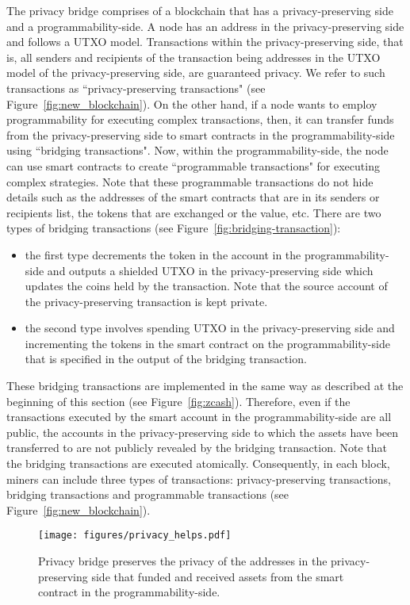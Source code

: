 \documentclass{article}
\begin{document}
The privacy bridge comprises of a blockchain that has a privacy-preserving side and a programmability-side. A node has an address in the privacy-preserving side and follows a UTXO model. Transactions within the privacy-preserving side, that is, all senders and recipients of the transaction being addresses in the UTXO model of the privacy-preserving side, are guaranteed  privacy.   We refer to such transactions as ``privacy-preserving transactions" (see Figure~\ref{fig:new_blockchain}). On the other hand, if a node wants to employ programmability for executing complex transactions, then, it can transfer funds from the privacy-preserving side to smart contracts in the programmability-side using ``bridging transactions". Now, within the programmability-side, the node can use smart contracts  to create ``programmable transactions" for executing complex strategies. Note that these programmable transactions do not hide  details such as the addresses of the smart contracts that are in its senders or recipients list, the tokens that are exchanged or the value, etc.  There are two types of bridging transactions (see  Figure~\ref{fig:bridging-transaction}): 
\begin{itemize}
    \item the first type decrements the token in the account in the programmability-side and outputs a shielded UTXO in the privacy-preserving side which updates the coins held by the transaction. Note that the source account of the privacy-preserving transaction is kept private. 
    \item the second type involves spending UTXO in the privacy-preserving side and incrementing the tokens in the smart contract on the programmability-side that is specified in the output of the bridging transaction.
\end{itemize}
These bridging transactions are implemented in the same way as described at the beginning of this section (see Figure~\ref{fig:zcash}). Therefore, even if the transactions executed by the smart account in the programmability-side are all public, the accounts in the privacy-preserving side to which the assets have been transferred to are not publicly revealed by the bridging transaction. Note that the bridging transactions are executed atomically. Consequently,  in each block, miners can include three types of transactions: privacy-preserving transactions, bridging transactions and programmable transactions (see Figure~\ref{fig:new_blockchain}). 

\begin{figure}[h]
    \centering
    \texttt{[image: figures/privacy\_helps.pdf]}
    \caption{Privacy bridge preserves the privacy of the addresses in the privacy-preserving side that funded and received assets from the smart contract in the programmability-side.}
    \label{fig:privacy-helps}
\end{figure}
\end{document}
